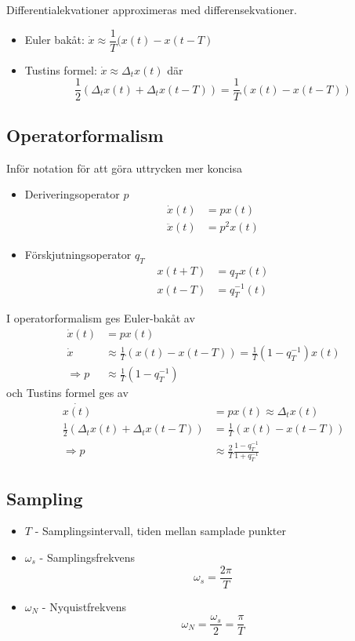 \documentclass[12pt]{article}
\begin{document}
Differentialekvationer approximeras med differensekvationer.
\begin{itemize}
\item Euler bakåt: $\dot{x} \approx \dfrac{1}{T}(x(t) - x(t-T)$
\item Tustins formel: $\dot{x} \approx \Delta_t x(t)$ där 
  \[\frac{1}{2}(\Delta_tx(t) + \Delta_tx(t-T)) = \frac{1}{T}(x(t)-x(t-T))\]
\end{itemize}
\subsection*{Operatorformalism}
Inför notation för att göra uttrycken mer koncisa
\begin{itemize}
\item Deriveringsoperator $p$ 
\begin{align*}
  \dot{x}(t) &= px(t) \\
  \ddot{x}(t) &= p^2x(t)
\end{align*}
\item Förskjutningsoperator $q_T$
\begin{align*}
  x(t+T) &= q_Tx(t) \\
  x(t-T) &= q_T^{-1}(t)
\end{align*}
\end{itemize}
I operatorformalism ges Euler-bakåt av
\begin{align*}
  \dot{x}(t) &= px(t) \\
  \dot{x} &\approx \frac{1}{T}(x(t)-x(t-T)) = \frac{1}{T}(1-q_T^{-1})x(t) \\
  \Rightarrow p &\approx \frac{1}{T}(1-q_T^{-1})
\end{align*}
och Tustins formel ges av
\begin{align*}
  \dot{x(t)} &= px(t) \approx \Delta_t x(t) \\
  \frac{1}{2}(\Delta_tx(t) + \Delta_tx(t-T)) &= \frac{1}{T}(x(t)-x(t-T)) \\
  \Rightarrow p &\approx \frac{2}{T} \frac{1-q_T^{-1}}{1+q_T^{-1}}
\end{align*}

\subsection*{Sampling}

\begin{itemize}
\item $T$ - Samplingsintervall, tiden mellan samplade punkter
\item $\omega_s$ - Samplingsfrekvens 
  \[\omega_s = \frac{2 \pi}{T}\]
\item $\omega_N$ - Nyquistfrekvens 
  \[\omega_N = \frac{\omega_s}{2} = \frac{\pi}{T}\]
\end{itemize}
\end{document}
